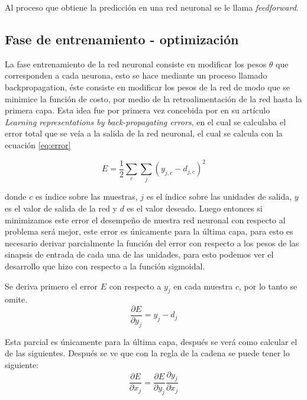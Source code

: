 \par Al proceso que obtiene la predicción en una red neuronal se le llama \textit{feedforward}.

\subsection{Fase de entrenamiento - optimización}

\par La fase entrenamiento de la red neuronal consiste en modificar los pesos $\theta$ que corresponden a cada neurona, esto se hace mediante un proceso llamado \gls{backpropagation}, éste consiste en modificar los pesos de la red de modo que se minimice la función de costo, por medio de la retroalimentación de la red hasta la primera capa. Esta idea fue por primera vez concebida por \textcite{rumelhart1986learning} en su artículo \textit{Learning representations by back-propagating errors}, en el cual se calculaba el error total que se veía a la salida de la red neuronal, el cual se calcula con la ecuación \ref{eq:error}

\begin{equation}\label{eq:error}
	E=\frac{1}{2}\sum _{c}\sum _{j}( y_{j,c} -d_{j,c})^{2}
\end{equation}

donde $c$ es índice sobre las muestras, $j$ es el índice sobre las unidades de salida, $y$ es el valor de salida de la red y $d$ es el valor deseado. Luego entonces si minimizamos este error el desempeño de nuestra red neuronal con respecto al problema será mejor, este error es únicamente para la última capa, para esto es necesario derivar parcialmente la función del error con respecto a los pesos de las sinapsis de entrada de cada una de las unidades, para esto podemos ver el desarrollo que hizo \textcite{rumelhart1986learning} con respecto a la función sigmoidal.

\par Se deriva primero el error $E$ con respecto a $y_{j}$ en cada muestra $c$, por lo tanto se omite.
\begin{equation}
	\frac{\partial E}{\partial y_{j}} =y_{j} -d_{j}
\end{equation}
\par Esta parcial es únicamente para la última capa, después se verá como calcular el de las siguientes. Después se ve que con la regla de la cadena se puede tener lo siguiente:
\begin{equation}
	\frac{\partial E}{\partial x_{j}} =\frac{\partial E}{\partial y_{j}}  \frac{\partial y_{j}}{\partial x_{j}}
\end{equation}

